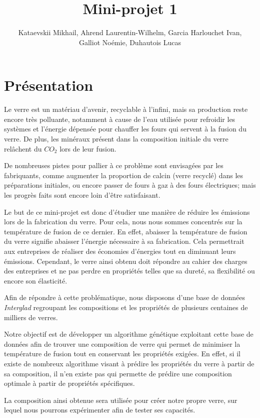 \documentclass{article}
\title{Mini-projet 1}
\author{Kataevskii Mikhail, Ahrend Laurentin-Wilhelm, Garcia Harlouchet Ivan, \\ Galliot Noémie, Duhautois Lucas}
\begin{document}
\maketitle

\section{Présentation}

Le verre est un matériau d'avenir, recyclable à l'infini, mais sa production reste encore très polluante, notamment à cause de l'eau utilisée pour refroidir les systèmes et l'énergie dépensée pour chauffer les fours qui servent à la fusion du verre. De plus, les minéraux présent dans la composition initiale du verre relâchent du $CO_2$ lors de leur fusion.

De nombreuses pistes pour pallier à ce problème sont envisagées par les fabriquants, comme augmenter la proportion de calcin (verre recyclé) dans les préparations initiales, ou encore passer de fours à gaz à des fours électriques; mais les progrès faits sont encore loin d'être satisfaisant.

Le but de ce mini-projet est donc d'étudier une manière de réduire les émissions lors de la fabrication du verre. Pour cela, nous nous sommes concentrés sur la température de fusion de ce dernier. En effet, abaisser la température de fusion du verre signifie abaisser l'énergie nécessaire à sa fabrication. Cela permettrait aux entreprises de réaliser des économies d'énergies tout en diminuant leurs émissions. Cependant, le verre ainsi obtenu doit répondre au cahier des charges des entreprises et ne pas perdre en propriétés telles que sa dureté, sa flexibilité ou encore son élasticité.

Afin de répondre à cette problématique, nous disposons d'une base de données \textit{Interglad} regroupant les compositions et les propriétés de plusieurs centaines de milliers de verres.

Notre objectif est de développer un algorithme génétique exploitant cette base de données afin de trouver une composition de verre qui permet de minimiser la température de fusion tout en conservant les propriétés exigées. En effet, si il existe de nombreux algorithme visant à prédire les propriétés du verre à partir de sa composition, il n'en existe pas qui permette de prédire une composition optimale à partir de propriétés spécifiques.

La composition ainsi obtenue sera utilisée pour créer notre propre verre, sur lequel nous pourrons expérimenter afin de tester ses capacités.
\end{document}
